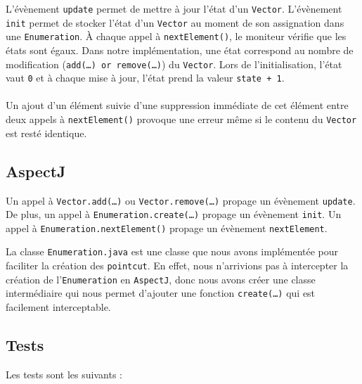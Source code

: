 \documentclass{article}
\begin{document}
L'évènement \texttt{update} permet de mettre à jour l'état d'un \texttt{Vector}.
L'évènement \texttt{init} permet de stocker l'état d'un \texttt{Vector} au
moment de son assignation dans une \texttt{Enumeration}. À chaque appel à
\texttt{nextElement()}, le moniteur vérifie que les états sont égaux. Dans notre
implémentation, une état correspond au nombre de modification
(\texttt{add(\ldots) or \texttt{remove(\ldots)}}) du \texttt{Vector}. Lors de
l'initialisation, l'état vaut \texttt{0} et à chaque mise à jour, l'état prend
la valeur \texttt{state + 1}.

\paragraph{\danger} Un ajout d'un élément suivie d'une suppression immédiate de
cet élément entre deux appels à \texttt{nextElement()} provoque une erreur même
si le contenu du \texttt{Vector} est resté identique.

\subsection{AspectJ}

Un appel à \texttt{Vector.add(\ldots)} ou \texttt{Vector.remove(\ldots)} propage
un évènement \texttt{update}. De plus, un appel à
\texttt{Enumeration.create(\ldots)} propage un évènement \texttt{init}. Un appel à \texttt{Enumeration.nextElement()}
propage un évènement \texttt{nextElement}.

\vspace{0.3cm}

La classe \texttt{Enumeration.java} est une classe que nous avons implémentée
pour faciliter la création des \texttt{pointcut}. En effet, nous n'arrivions pas
à intercepter la création de l'\texttt{Enumeration} en \texttt{AspectJ}, donc
nous avons créer une classe intermédiaire qui nous permet d'ajouter une fonction
\texttt{create(\ldots)} qui est facilement interceptable.

\subsection{Tests}

Les tests sont les suivants :
\end{document}
